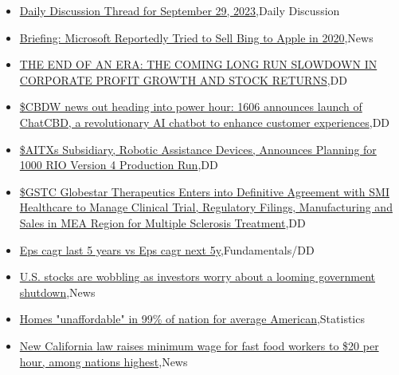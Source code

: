 \documentclass{article}%
\begin{document}
%
\begin{itemize}%
\item%
\href{https://reddit.com/r/wallstreetbets/comments/16v7g6m/daily\_discussion\_thread\_for\_september\_29\_2023/}{Daily Discussion Thread for September 29, 2023},Daily Discussion%
\item%
\href{https://reddit.com/r/wallstreetbets/comments/16uzfk5/briefing\_microsoft\_reportedly\_tried\_to\_sell\_bing/}{Briefing: Microsoft Reportedly Tried to Sell Bing to Apple in 2020},News%
\item%
\href{https://reddit.com/r/wallstreetbets/comments/16uyxbs/the\_end\_of\_an\_era\_the\_coming\_long\_run\_slowdown\_in/}{THE END OF AN ERA: THE COMING LONG RUN SLOWDOWN IN CORPORATE PROFIT GROWTH AND STOCK RETURNS},DD%
\item%
\href{https://reddit.com/r/Baystreetbets/comments/16uoeit/cbdw\_news\_out\_heading\_into\_power\_hour\_1606/}{\$CBDW news out heading into power hour: 1606 announces launch of ChatCBD, a revolutionary AI chatbot to enhance customer experiences},DD%
\item%
\href{https://reddit.com/r/Baystreetbets/comments/16ujqev/aitxs\_subsidiary\_robotic\_assistance\_devices/}{\$AITXs Subsidiary, Robotic Assistance Devices, Announces Planning for 1000 RIO Version 4 Production Run},DD%
\item%
\href{https://reddit.com/r/Baystreetbets/comments/16ugd5p/gstc\_globestar\_therapeutics\_enters\_into/}{\$GSTC Globestar Therapeutics Enters into Definitive Agreement with SMI Healthcare to Manage Clinical Trial, Regulatory Filings, Manufacturing and Sales in MEA Region for Multiple Sclerosis Treatment},DD%
\item%
\href{https://reddit.com/r/StockMarket/comments/16uozhs/eps\_cagr\_last\_5\_years\_vs\_eps\_cagr\_next\_5y/}{Eps cagr last 5 years vs Eps cagr next 5y},Fundamentals/DD%
\item%
\href{https://reddit.com/r/StockMarket/comments/16ui0vo/us\_stocks\_are\_wobbling\_as\_investors\_worry\_about\_a/}{U.S. stocks are wobbling as investors worry about a looming government shutdown},News%
\item%
\href{https://reddit.com/r/Economics/comments/16v9wg2/homes\_unaffordable\_in\_99\_of\_nation\_for\_average/}{Homes "unaffordable" in 99\% of nation for average American},Statistics%
\item%
\href{https://reddit.com/r/Economics/comments/16v3xh8/new\_california\_law\_raises\_minimum\_wage\_for\_fast/}{New California law raises minimum wage for fast food workers to \$20 per hour, among nations highest},News%

\end{itemize}
\end{document}
